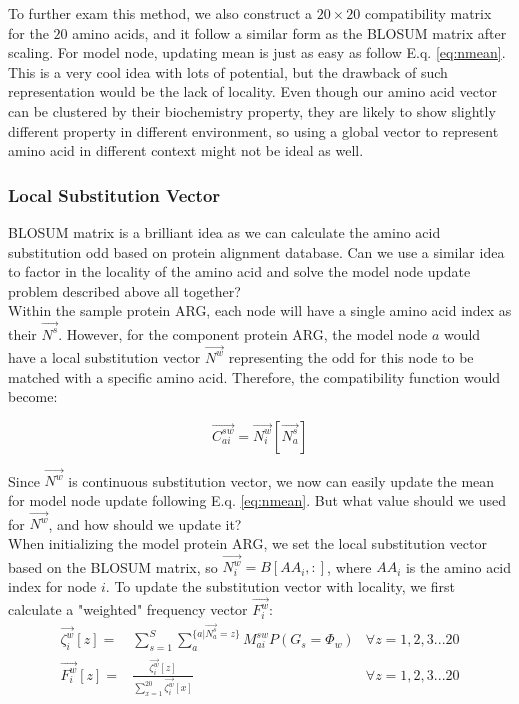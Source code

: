 To further exam this method, we also construct a $20\times 20$ compatibility matrix for the $20$ amino acids, and it follow a similar form as the BLOSUM matrix after scaling. For model node, updating mean is  just as easy as follow E.q. \ref{eq:nmean}.\\

This is a very cool idea with lots of potential, but the drawback of such representation would be the lack of locality. Even though our amino acid vector can be clustered by their biochemistry property, they are likely to show slightly different property in different environment, so using a global vector to represent amino acid in different context might not be ideal as well. 

\subsubsection{Local Substitution Vector}

BLOSUM matrix is a brilliant idea as we can calculate the amino acid substitution odd based on protein alignment database. Can we use a similar idea to factor in the locality of the amino acid and solve the model node update problem described above all together?\\

Within the sample protein ARG, each node will have a single amino acid index as their $\overrightarrow{N^s}$. However, for the component protein ARG, the model node $a$ would have a local substitution vector $\overrightarrow{N^w}$ representing the odd for this node to be matched with a specific amino acid. Therefore, the compatibility function would become:

\begin{equation} 
\overrightarrow{C_{ai}^{sw}}=\overrightarrow{N^w_i}[\overrightarrow{N^s_a}]
\end{equation}

Since $\overrightarrow{N^w}$ is continuous substitution vector, we now can easily update the mean for model node update following E.q. \ref{eq:nmean}. But what value should we used for $\overrightarrow{N^w}$, and how should we update it?\\

When initializing the model protein ARG, we set the local substitution vector based on the BLOSUM matrix, so $\overrightarrow{N^w_i}=B[AA_i,:]$, where $AA_i$ is the amino acid index for node $i$. To update the substitution vector with locality, we first calculate a "weighted" frequency vector $\overrightarrow{F^w_i}$:
\begin{align} 
\overrightarrow{\zeta^w_i}[z] = & \sum^{S}_{s=1}\sum^{\{a|\overrightarrow{N^s_a}=z\}}_{a}M^{sw}_{ai}P(G_s=\Phi_w) & \forall z=1,2,3...20\\
\overrightarrow{F^w_i}[z] = & \frac{\overrightarrow{\zeta^w_i}[z]}{\sum^{20}_{x=1}\overrightarrow{\zeta^w_i}[x]} & \forall z=1,2,3...20
\end{align}

